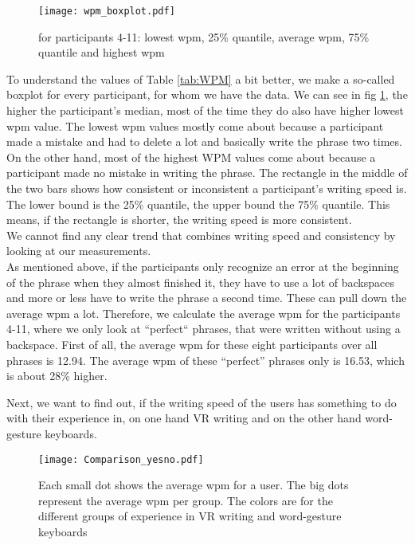 \begin{figure}[H]
    \centering
    \texttt{[image: wpm\_boxplot.pdf]}
    \caption{for participants 4-11: lowest wpm, 25\% quantile, average wpm, 75\% quantile and highest wpm}
    \label{fig:WPM}
\end{figure}
To understand the values of Table \ref{tab:WPM} a bit better, we make a so-called boxplot for every participant, for whom we have the data. We can see in fig \ref{fig:WPM}, the higher the participant's median, most of the time they do also have higher lowest wpm value. The lowest wpm values mostly come about because a participant made a mistake and had to delete a lot and basically write the phrase two times. On the other hand, most of the highest WPM values come about because a participant made no mistake in writing the phrase. The rectangle in the middle of the two bars shows how consistent or inconsistent a participant's writing speed is. The lower bound is the 25\% quantile, the upper bound the 75\% quantile. This means, if the rectangle is shorter, the writing speed is more consistent.\\
We cannot find any clear trend that combines writing speed and consistency by looking at our measurements.\\
As mentioned above, if the participants only recognize an error at the beginning of the phrase when they almost finished it, they have to use a lot of backspaces and more or less have to write the phrase a second time. These can pull down the average wpm a lot. Therefore, we calculate the average wpm for the participants 4-11, where we only look at ``perfect`` phrases, that were written without using a backspace. First of all, the average wpm for these eight participants over all phrases is 12.94. The average wpm of these ``perfect'' phrases only is 16.53, which is about 28\% higher. 

Next, we want to find out, if the writing speed of the users has something to do with their experience in, on one hand VR writing and on the other hand word-gesture keyboards.\\

\begin{figure}[H]
    \centering
    \texttt{[image: Comparison\_yesno.pdf]}
    \caption{Each small dot shows the average wpm for a user. The big dots represent the average wpm per group. The colors are for the different groups of experience in VR writing and word-gesture keyboards}
    \label{fig:WPM_yesno}
\end{figure}

